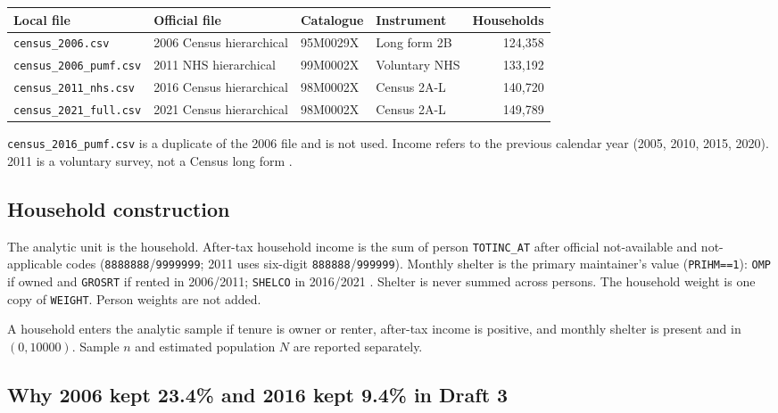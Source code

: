 \documentclass[11pt,letterpaper]{article}
\begin{document}
\begin{center}
\small
\begin{tabular}{llllr}
\toprule
Local file & Official file & Catalogue & Instrument & Households \\
\midrule
\texttt{census\_2006.csv} & 2006 Census hierarchical & 95M0029X & Long form 2B & 124,358 \\
\texttt{census\_2006\_pumf.csv} & 2011 NHS hierarchical & 99M0002X & Voluntary NHS & 133,192 \\
\texttt{census\_2011\_nhs.csv} & 2016 Census hierarchical & 98M0002X & Census 2A-L & 140,720 \\
\texttt{census\_2021\_full.csv} & 2021 Census hierarchical & 98M0002X & Census 2A-L & 149,789 \\
\bottomrule
\end{tabular}
\end{center}

\texttt{census\_2016\_pumf.csv} is a duplicate of the 2006 file and is not used.
Income refers to the previous calendar year (2005, 2010, 2015, 2020).
2011 is a voluntary survey, not a Census long form \cite{statcan2011nhs,statcan2016pumf,statcan2022pumf}.

\subsection{Household construction}

The analytic unit is the household.
After-tax household income is the sum of person \texttt{TOTINC\_AT} after official not-available and not-applicable codes (\texttt{8888888}/\texttt{9999999}; 2011 uses six-digit \texttt{888888}/\texttt{999999}).
Monthly shelter is the primary maintainer's value (\texttt{PRIHM==1}): \texttt{OMP} if owned and \texttt{GROSRT} if rented in 2006/2011; \texttt{SHELCO} in 2016/2021 \cite{statcan2006pumf}.
Shelter is never summed across persons.
The household weight is one copy of \texttt{WEIGHT}.
Person weights are not added.

A household enters the analytic sample if tenure is owner or renter, after-tax income is positive, and monthly shelter is present and in $(0, 10000)$.
Sample $n$ and estimated population $N$ are reported separately.

\subsection{Why 2006 kept 23.4\% and 2016 kept 9.4\% in Draft 3}
\end{document}
